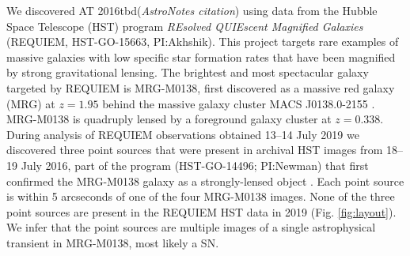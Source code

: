 \documentclass[12pt]{article}
\def\TNSname{AT 2016tbd\xspace}
\def\SNABC{AT 2016tbd\xspace}
\begin{document}
We discovered \SNABC ({\it AstroNotes citation})
using data from the Hubble Space Telescope (HST) program {\it REsolved QUIEscent Magnified Galaxies} (REQUIEM, HST-GO-15663, PI:Akhshik). This project targets rare examples of massive galaxies with low specific star formation rates that have been magnified by strong gravitational lensing. %
The brightest and most spectacular galaxy targeted by REQUIEM
is MRG-M0138, first discovered as a massive red galaxy (MRG) at $z=1.95$ \cite{newman_resolving_2018} behind the massive galaxy cluster MACS J0138.0-2155 \cite{ebeling_macs_2001}.
MRG-M0138 is quadruply lensed by a foreground galaxy cluster at $z=0.338$.  
During analysis of REQUIEM observations obtained 13--14 July 2019
we discovered three point 
sources that were present in archival HST images from 18--19 July 2016, part of the program (HST-GO-14496; PI:Newman)
that first confirmed the MRG-M0138 galaxy as a strongly-lensed object 
. 
Each point source is within 5 arcseconds of one of the four MRG-M0138 images.  None of the
three point sources are present in the REQUIEM HST data in 2019 (Fig. \ref{fig:layout}). We infer that 
the point sources are multiple images of a single astrophysical 
transient in MRG-M0138, most likely a SN. %
\end{document}
